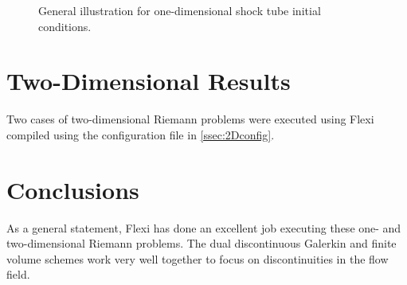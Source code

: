 \documentclass[review]{elsarticle}
\begin{document}
\begin{figure}[ht]
 \begin{center}
  
  \caption{General illustration for one-dimensional shock tube initial conditions.}
  \label{fig:shockTube}
 \end{center}
\end{figure}







\section{Two-Dimensional Results}\label{sec:2D}

Two cases of two-dimensional Riemann problems were executed using Flexi compiled using the configuration file in \ref{ssec:2Dconfig}.





\section{Conclusions}

As a general statement, Flexi has done an excellent job executing these one- and two-dimensional Riemann problems.  The dual discontinuous Galerkin and finite volume schemes work very well together to focus on discontinuities in the flow field.




\end{document}
